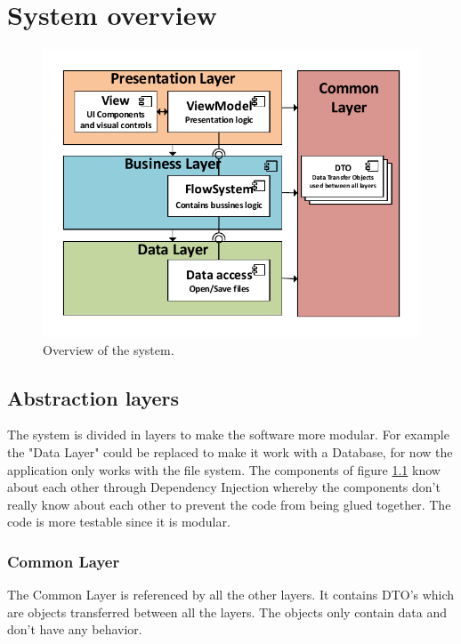 \chapter{System overview}
\begin{figure}[h!]
  \centering
    \includegraphics{figures/SystemOverview.pdf}
  \caption{Overview of the system.}
  \label{fig:systemoverview}
\end{figure}

\section{Abstraction layers}
The system is divided in layers to make the software more modular. For example the "Data Layer" could be replaced to make it work with a Database, for now the application only works with the file system. The components of figure \ref{fig:systemoverview} know about each other through Dependency Injection whereby the components don't really know about each other to prevent the code from being glued together. The code is more testable since it is modular.

\subsection{Common Layer}
The Common Layer is referenced by all the other layers. It contains DTO's which are objects transferred between all the layers. The objects only contain data and don't have any behavior.

